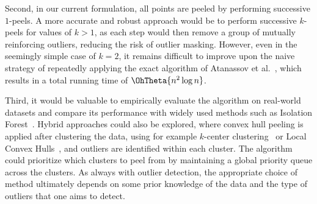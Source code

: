 Second, in our current formulation, all points are peeled by performing successive $1$-peels. 
A more accurate and robust approach would be to perform successive $k$-peels for values of $k > 1$, as each step would then remove a group of mutually reinforcing outliers, reducing the risk of outlier masking. 
However, even in the seemingly simple case of $k = 2$, it remains difficult to improve upon the naive strategy of repeatedly applying the exact algorithm of Atanassov et al.~\cite{2009_Atanassov_exact_small_k}, which results in a total running time of $\OhTheta{n^2 \log n}$. 

Third, it would be valuable to empirically evaluate the algorithm on real-world datasets and compare its performance with widely used methods such as Isolation Forest~\cite{4781136, 10.1145/2133360.2133363}. 
Hybrid approaches could also be explored, where convex hull peeling is applied after clustering the data, using for example $k$-center clustering~\cite{Hakimi_k_center} or Local Convex Hulls~\cite{Getz_local_convex_hull_biology}, and outliers are identified within each cluster. 
The algorithm could prioritize which clusters to peel from by maintaining a global priority queue across the clusters. 
As always with outlier detection, the appropriate choice of method ultimately depends on some prior knowledge of the data and the type of outliers that one aims to detect.



